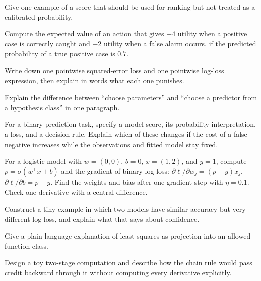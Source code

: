 \begin{exercises}
\item {}Give one example of a score that should be used for ranking but not treated as a calibrated probability.
\item {}Compute the expected value of an action that gives \(+4\) utility when a positive case is correctly caught and \(-2\) utility when a false alarm occurs, if the predicted probability of a true positive case is \(0.7\).
\item {}Write down one pointwise squared-error loss and one pointwise log-loss expression, then explain in words what each one punishes.
\item {}Explain the difference between ``choose parameters'' and ``choose a predictor from a hypothesis class'' in one paragraph.
\item {}For a binary prediction task, specify a model score, its probability interpretation, a loss, and a decision rule. Explain which of these changes if the cost of a false negative increases while the observations and fitted model stay fixed.
\item {}For a logistic model with $w=(0,0)$, $b=0$, $x=(1,2)$, and $y=1$, compute $p=\sigma(w^\top x+b)$ and the gradient of binary log loss: $\partial\ell/\partial w_j=(p-y)x_j$, $\partial\ell/\partial b=p-y$. Find the weights and bias after one gradient step with $\eta=0.1$. Check one derivative with a central difference.

\end{exercises}

\begin{challengeexercises}
\item {}Construct a tiny example in which two models have similar accuracy but very different log loss, and explain what that says about confidence.
\item {}Give a plain-language explanation of least squares as projection into an allowed function class.
\item {}Design a toy two-stage computation and describe how the chain rule would pass credit backward through it without computing every derivative explicitly.
\end{challengeexercises}
